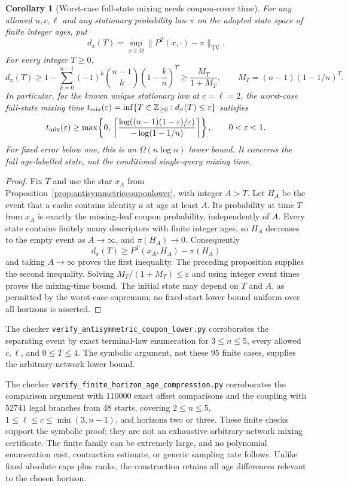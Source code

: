 \documentclass[11pt]{article}
\newtheorem{corollary}[theorem]{Corollary}
\newcommand{\TV}{\mathrm{TV}}
\begin{document}
\begin{corollary}[Worst-case full-state mixing needs coupon-cover time]
\label{cor:fullstatemixingcouponlower}
For any allowed $n,c,\ell$ and any stationary probability
law $\pi$ on the adopted state space of finite integer ages, put
\[
 d_\pi(T)=\sup_{x\in\Omega}\|P^T(x,\cdot)-\pi\|_{\TV}.
\]
For every integer $T\ge0$,
\[
 d_\pi(T)\ge
 1-\sum_{k=0}^{n-1}(-1)^k\binom{n-1}{k}
                    \left(1-\frac{k}{n}\right)^T
 \ge\frac{M_T}{1+M_T},
 \qquad M_T=(n-1)(1-1/n)^T.
\]
In particular, for the known unique stationary law at
$c=\ell=2$, the worst-case full-state mixing time
$t_{\rm mix}(\varepsilon)=\inf\{T\in\mathbb Z_{\ge0}:
d_\pi(T)\le\varepsilon\}$ satisfies
\[
 t_{\rm mix}(\varepsilon)\ge
 \max\!\left\{0,\,
 \left\lceil
 \frac{\log((n-1)(1-\varepsilon)/\varepsilon)}
      {-\log(1-1/n)}
 \right\rceil\right\},\qquad 0<\varepsilon<1.
\]
For fixed error below one, this is an $\Omega(n\log n)$
lower bound. It concerns the full age-labelled state, not
the conditional single-query mixing time.
\end{corollary}
\begin{proof}
Fix $T$ and use the star $x_A$ from
Proposition~\ref{prop:antisymmetriccouponlower}, with integer
$A>T$. Let $H_A$ be the event that a cache contains identity
$a$ at age at least $A$. Its probability at time $T$ from
$x_A$ is exactly the missing-leaf coupon probability,
independently of $A$. Every state contains finitely many
descriptors with finite integer ages, so $H_A$ decreases to
the empty event as $A\to\infty$, and $\pi(H_A)\to0$.
Consequently
\[
 d_\pi(T)\ge P^T(x_A,H_A)-\pi(H_A)
\]
and taking $A\to\infty$ proves the first inequality.
The preceding proposition supplies the second inequality.
Solving $M_T/(1+M_T)\le\varepsilon$ and using integer
event times proves the mixing-time bound. The initial
state may depend on $T$ and $A$, as permitted by the
worst-case supremum; no fixed-start lower bound uniform
over all horizons is asserted.
\end{proof}

The checker \texttt{verify\_antisymmetric\_coupon\_lower.py}
corroborates the separating event by exact terminal-law
enumeration for $3\le n\le5$, every allowed $c,\ell$,
and $0\le T\le4$. The symbolic argument, not these $95$
finite cases, supplies the arbitrary-network lower bound.

The checker \texttt{verify\_finite\_horizon\_age\_compression.py}
corroborates the comparison argument with $110000$ exact
offset comparisons and the coupling with $52741$ legal
branches from $48$ starts, covering $2\le n\le5$,
$1\le\ell\le c\le\min(3,n-1)$, and horizons two or three.
These finite checks support the symbolic proof; they are not
an exhaustive arbitrary-network mixing certificate. The
finite family can be extremely large, and no polynomial
enumeration cost, contraction estimate, or generic sampling
rate follows. Unlike fixed absolute caps plus ranks, the
construction retains all age differences relevant to the
chosen horizon.
\end{document}
